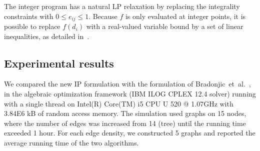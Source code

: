 \documentclass[english]{llncs}
\begin{document}
The integer program has a natural LP relaxation by replacing the integrality
constraints with $0 \leq e_{ij} \leq 1$. 
Because $f$ is only evaluated at integer points, it is possible to replace $f(d_i)$
with a real-valued variable bound by a set of linear inequalities, as detailed in~\cite{Gutfraind14}.

%
%

\subsection{Experimental results}

We compared the new IP formulation with the formulation of
Bradonjic~et~al.~\cite{Gutfraind14}, in the algebraic optimization framework
(IBM ILOG CPLEX 12.4 solver) running with a single thread on Intel(R) Core(TM)
i5 CPU U 520  @ 1.07GHz with 3.84E6 kB of random access memory.  The simulation
used graphs on 15 nodes, where the number of edges was increased from 14 (tree)
until the running time exceeded 1 hour.  For each edge density, we constructed
5 graphs and reported the average running time of the two algorithms.
\end{document}
